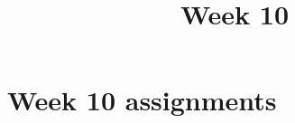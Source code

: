 \documentclass{xourse}
\title{Week 10}
\begin{document}
\begin{abstract}
\end{abstract}
\maketitle

\part{Week 10 assignments}
\end{document}
